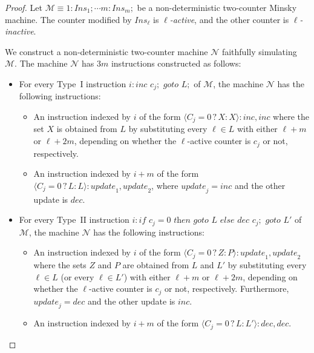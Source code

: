 \documentclass[a4paper,UKenglish,cleveref, autoref, thm-restate]{lipics-v2021}
\newcommand{\M}{\mathcal{M}}
\newcommand{\Ins}{\mathit{Ins}}
\newcommand{\update}{\textit{update}}
\newcommand{\Dec}{\textit{dec}}
\newcommand{\Inc}{\textit{inc}}
\begin{document}
\begin{proof}
    Let $\M \equiv 1:\Ins_1;\cdots m: \Ins_m;$ be a non-deterministic two-counter Minsky machine. The counter modified by $\Ins_\ell$ is \emph{$\ell$-active}, and the other counter is \emph{$\ell$-inactive}.
    
    We construct a non-deterministic two-counter machine $\mathcal{N}$ faithfully simulating~$\M$. The machine $\mathcal{N}$ has $3m$ instructions constructed as follows:
    \begin{itemize}
        \item For every Type~I instruction $i: \textit{inc } c_j; \textit{ goto } L;$ of $\M$, the machine $\mathcal{N}$ has the following instructions:
        \begin{itemize}
            \item An instruction indexed by $i$ of the form 
               \( 
                   \langle C_j{=}0 \,?\, X : X \rangle : \Inc,\Inc
               \)
               where the set $X$ is obtained from $L$ by substituting every $\ell \in L$ with either $\ell + m$ or $\ell +2m$, depending on whether the $\ell$-active counter is $c_j$ or not, respectively.
            \item An instruction indexed by $i {+} m$ of the form
               \( 
                   \langle C_j{=}0 \,?\, L : L \rangle : \update_1,\update_2
               \),
               where $\update_j = \Inc$ and the other update is $\Dec$.
        \end{itemize}
        \item For every Type~II instruction $i: \textit{if } c_j{=}0 \textit{ then goto } L \textit{ else dec } c_j; \textit{ goto } L'$ of $\M$, the machine $\mathcal{N}$ has the following instructions:
        \begin{itemize}
            \item An instruction indexed by $i$ of the form 
               \( 
                   \langle C_j{=}0 \,?\, Z : P \rangle : \update_1,\update_2
               \)
               where the sets $Z$ and $P$ are obtained from $L$ and $L'$ by substituting every $\ell \in L$ (or every $\ell \in L'$) with either $\ell + m$ or $\ell +2m$, depending on whether the $\ell$-active counter is $c_j$ or not, respectively. Furthermore, $\update_j = \Dec$ and the other update is $\Inc$.
            \item An instruction indexed by $i {+} m$ of the form
               \( 
                   \langle C_j{=}0 \,?\, L : L' \rangle : \Dec,\Dec
               \).

\end{itemize}
\end{itemize}
\end{proof}
\end{document}
